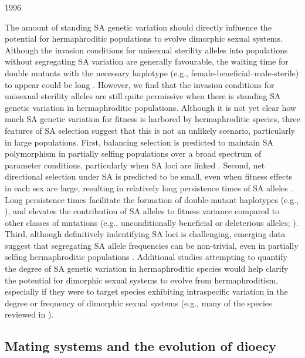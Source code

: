 1996\documentclass[9pt,twocolumn,twoside,lineno]{gsajnl}
\begin{document}
The amount of standing SA genetic variation should directly influence the potential for hermaphroditic populations to evolve dimorphic sexual systems. Although the invasion conditions for unisexual sterility alleles into populations without segregating SA variation are generally favourable, the waiting time for double mutants with the necessary haplotype (e.g., female-beneficial--male-sterile) to appear could be long \citep{WeinreichChao2005,ConnallonClark2010}. However, we find that the invasion conditions for unisexual sterility alleles are still quite permissive when there is standing SA genetic variation in hermaphroditic populations. Although it is not yet clear how much SA genetic variation for fitness is harbored by hermaphroditic species, three features of SA selection suggest that this is not an unlikely scenario, particularly in large populations. First, balancing selection is predicted to maintain SA polymorphism in partially selfing populations over a broad spectrum of parameter conditions, particularly when SA loci are linked \citep{Patten2010,JordanConnallon2014,Olito2016}. Second, net directional selection under SA is predicted to be small, even when fitness effects in each sex are large, resulting in relatively long persistence times of SA alleles \citep{ConnallonClark2012}. Long persistence times facilitate the formation of double-mutant haplotypes (e.g., \citealt{WeinreichChao2005}), and elevates the contribution of SA alleles to fitness variance compared to other classes of mutations (e.g., unconditionally beneficial or deleterious alleles; \citealt{ConnallonClark2012}). Third, although definitively indentifying SA loci is challenging, emerging data suggest that segregating SA allele frequencies can be non-trivial, even in partially selfing hermaphroditic populations \citep{Barson2015,LeeKelly2015}. Additional studies attempting to quantify the degree of SA genetic variation in hermaphroditic species would help clarify the potential for dimorphic sexual systems to evolve from hermaphroditism, especially if they were to target species exhibiting intraspecific variation in the degree or frequency of dimorphic sexual systems (e.g., many of the species reviewed in \citealt{SakaiWeller1999,Barrett2010,Renner2014}).


\subsection{Mating systems and the evolution of dioecy}
\end{document}
